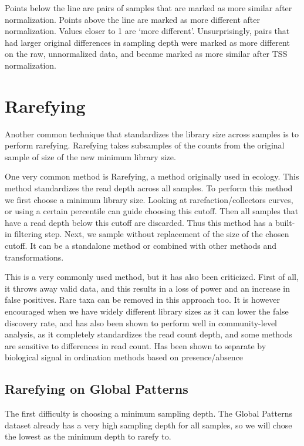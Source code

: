 \documentclass[
]{book}
\begin{document}
Points below the line are pairs of samples that are marked as more similar after normalization. Points above the line are marked as more different after normalization. Values closer to 1 are `more different'. Unsurprisingly, pairs that had larger original differences in sampling depth were marked as more different on the raw, unnormalized data, and became marked as more similar after TSS normalization.

\hypertarget{rarefying}{%
\chapter{Rarefying}\label{rarefying}}

Another common technique that standardizes the library size across samples is to perform rarefying. Rarefying takes subsamples of the counts from the original sample of size of the new minimum library size.

One very common method is Rarefying, a method originally used in ecology. This method standardizes the read depth across all samples. To perform this method we first choose a minimum library size. Looking at rarefaction/collectors curves, or using a certain percentile can guide choosing this cutoff. Then all samples that have a read depth below this cutoff are discarded. Thus this method has a built-in filtering step.
Next, we sample without replacement of the size of the chosen cutoff.
It can be a standalone method or combined with other methods and transformations.

This is a very commonly used method, but it has also been criticized. First of all, it throws away valid data, and this results in a loss of power and an increase in false positives. Rare taxa can be removed in this approach too.
It is however encouraged when we have widely different library sizes as it can lower the false discovery rate, and has also been shown to perform well in community-level analysis, as it completely standardizes the read count depth, and some methods are sensitive to differences in read count. Has been shown to separate by biological signal in ordination methods based on presence/absence

\hypertarget{rarefying-on-global-patterns}{%
\section{Rarefying on Global Patterns}\label{rarefying-on-global-patterns}}

The first difficulty is choosing a minimum sampling depth. The Global Patterns dataset already has a very high sampling depth for all samples, so we will chose the lowest as the minimum depth to rarefy to.
\end{document}
